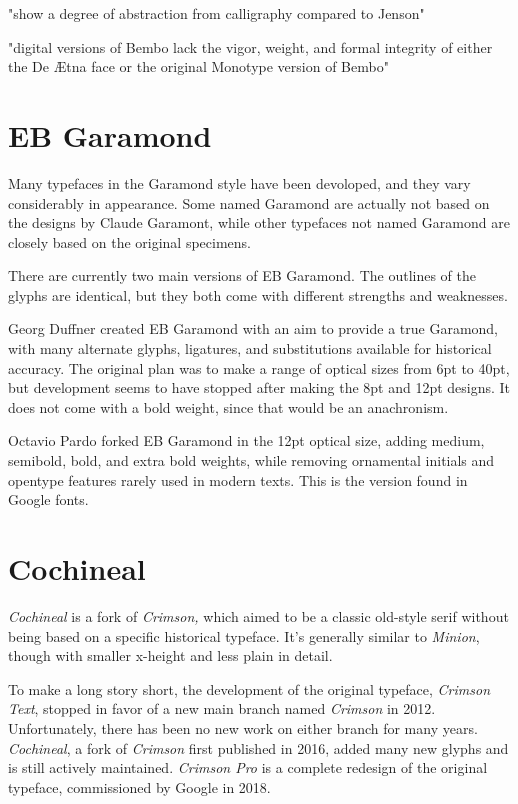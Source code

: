 "show a degree of abstraction from calligraphy compared to Jenson"

 

"digital versions of Bembo lack the vigor, weight, and formal integrity of either the De Ætna face or the original Monotype version of Bembo"

%
%

\switchtobodyfont[duffnerebgaramond,10pt]
\chapter[ebgaramond]{EB Garamond}

Many typefaces in the Garamond style have been devoloped, and they vary considerably in appearance. Some named Garamond are actually not based on the designs by Claude Garamont, while other typefaces not named Garamond are closely based on the original specimens.

There are currently two main versions of EB Garamond. The outlines of the glyphs are identical, but they both come with different strengths and weaknesses.

Georg Duffner created EB Garamond with an aim to provide a true Garamond, with many alternate glyphs, ligatures, and substitutions available for historical accuracy. The original plan was to make a range of optical sizes from 6pt to 40pt, but development seems to have stopped after making the 8pt and 12pt designs. It does not come with a bold weight, since that would be an anachronism. 

Octavio Pardo forked EB Garamond in the 12pt optical size, adding medium, semibold, bold, and extra bold weights, while removing ornamental initials and opentype features rarely used in modern texts. This is the version found in Google fonts.

%
%

\switchtobodyfont[cochineal,10pt]
\chapter[cochineal]{Cochineal}

{\it Cochineal} is a fork of {\it Crimson,} which aimed to be a classic old-style serif without being based on a specific historical typeface. It’s generally similar to {\it Minion}, though with smaller x-height and less plain in detail.

To make a long story short, the development of the original typeface, {\it Crimson Text}, stopped in favor of a new main branch named {\it Crimson} in 2012. Unfortunately, there has been no new work on either branch for many years.  {\it Cochineal}, a fork of {\it Crimson} first published in 2016, added many new glyphs and is still actively maintained. {\it Crimson Pro} is a complete redesign of the original typeface, commissioned by Google in 2018.

